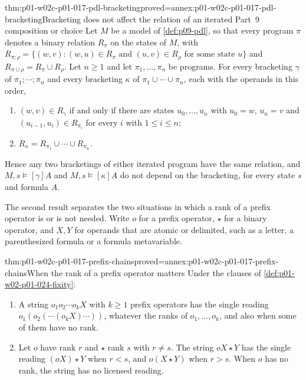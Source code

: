 \begin{hblemma}{thm:p01-w02c-p01-017-pdl-bracketing}{proved=annex:p01-w02c-p01-017-pdl-bracketing}{Bracketing does not affect the relation of an iterated Part~9 composition or choice}
Let \(M\) be a model of \cref{def:p09-pdl}, so that every program
\(\pi\) denotes a binary relation \(R_\pi\) on the states of \(M\), with
\(R_{\pi;\rho}=\{(w,v):(w,u)\in R_\pi\text{ and }(u,v)\in R_\rho\text{ for
some state }u\}\) and \(R_{\pi\cup\rho}=R_\pi\cup R_\rho\).  Let
\(n\geq1\) and let \(\pi_1,\ldots,\pi_n\) be programs.  For every
bracketing \(\gamma\) of \(\pi_1;\cdots;\pi_n\) and every bracketing
\(\kappa\) of \(\pi_1\cup\cdots\cup\pi_n\), each with the operands in this
order,
\begin{enumerate}
\item \((w,v)\in R_\gamma\) if and only if there are states
  \(u_0,\ldots,u_n\) with \(u_0=w\), \(u_n=v\) and
  \((u_{i-1},u_i)\in R_{\pi_i}\) for every \(i\) with \(1\leq i\leq n\);
\item \(R_\kappa=R_{\pi_1}\cup\cdots\cup R_{\pi_n}\).
\end{enumerate}
Hence any two bracketings of either iterated program have the same
relation, and \(M,s\models[\gamma]A\) and \(M,s\models[\kappa]A\) do not
depend on the bracketing, for every state \(s\) and formula \(A\).
\end{hblemma}

The second result separates the two situations in which a rank of a
prefix operator is or is not needed.  Write \(o\) for a prefix operator,
\(\star\) for a binary operator, and \(X,Y\) for operands that are atomic
or delimited, such as a letter, a parenthesized formula or a formula
metavariable.

\begin{hblemma}{thm:p01-w02c-p01-017-prefix-chains}{proved=annex:p01-w02c-p01-017-prefix-chains}{When the rank of a prefix operator matters}
Under the clauses of \cref{def:p01-w02-p01-024-fixity}:
\begin{enumerate}
\item A string \(o_1o_2\cdots o_kX\) with \(k\geq1\) prefix operators
  has the single reading \(o_1(o_2(\cdots(o_kX)\cdots))\), whatever the
  ranks of \(o_1,\ldots,o_k\), and also when some of them have no rank.
\item Let \(o\) have rank \(r\) and \(\star\) rank \(s\) with \(r\neq s\).
  The string \(oX\star Y\) has the single reading \((oX)\star Y\) when
  \(r<s\), and \(o(X\star Y)\) when \(r>s\).  When \(o\) has no rank, the
  string has no licensed reading.
\end{enumerate}
\end{hblemma}


